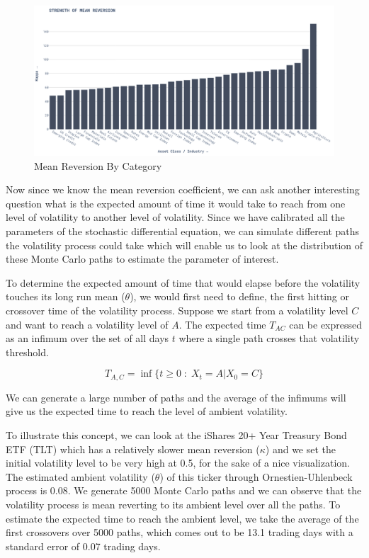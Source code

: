 \begin{figure}[H]
    \centering
    \includegraphics[width=\textwidth]{images/mean_reversion_by_category.png}
    \caption{Mean Reversion By Category}
    \label{fig:figure_label}
\end{figure}

Now since we know the mean reversion coefficient, we can ask another interesting question what is the expected amount of time it would take to reach from one level of volatility to another level of volatility. Since we have calibrated all the parameters of the stochastic differential equation, we can simulate different paths the volatility process could take which will enable us to look at the distribution of these Monte Carlo paths to estimate the parameter of interest.

To determine the expected amount of time that would elapse before the volatility touches its long run mean ($\theta$), we would first need to define, the first hitting or crossover time of the volatility process. Suppose we start from a volatility level $C$ and want to reach a volatility level of $A$. The expected time $T_{AC}$ can be expressed as an infimum over the set of all days $t$ where a single path crosses that volatility threshold.

$$ T_{A,C} = \inf\biggl\{ t\geq 0 \;: \; X_t = A \bigg| X_0 = C   \biggr\} $$

We can generate a large number of paths and the average of the infimums will give us the expected time to reach the level of ambient volatility.

To illustrate this concept, we can look at the iShares 20+ Year Treasury Bond ETF (TLT) which has a relatively slower mean reversion ($\kappa$) and we set the initial volatility level to be very high at 0.5, for the sake of a nice visualization. The estimated ambient volatility ($\theta$) of this ticker through Ornestien-Uhlenbeck process is 0.08. We generate 5000 Monte Carlo paths and we can observe that the volatility process is mean reverting to its ambient level over all the paths. To estimate the expected time to reach the ambient level, we take the average of the first crossovers over 5000 paths, which comes out to be 13.1 trading days with a standard error of 0.07 trading days.

